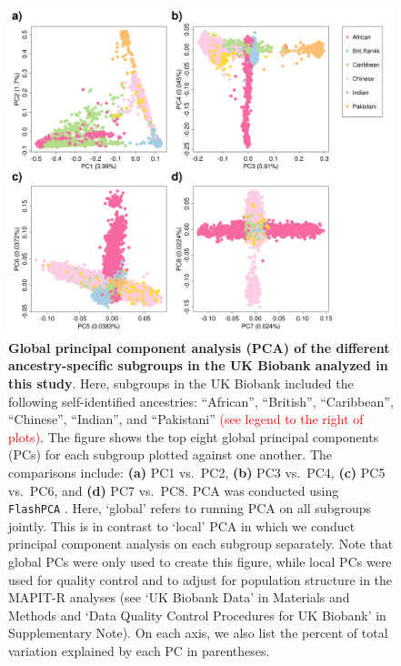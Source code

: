 \documentclass[10pt]{article}
\begin{document}
\begin{figure}[H]
\centering
\includegraphics[width = \textwidth]{Images/Supp/InterPath_Supp_Figure_UKB_PCAPlot_vs2.png}
\caption{\textbf{Global principal component analysis (PCA) of the different ancestry-specific subgroups in the UK Biobank analyzed in this study}. Here, subgroups in the UK Biobank included the following self-identified ancestries: ``African'', ``British'', ``Caribbean'', ``Chinese'', ``Indian'', and ``Pakistani'' \textcolor{red}{(see legend to the right of plots)}. The figure shows the top eight global principal components (PCs) for each subgroup plotted against one another. The comparisons include: \textbf{(a)} PC1 vs.~PC2, \textbf{(b)} PC3 vs.~PC4, \textbf{(c)} PC5 vs.~PC6, and \textbf{(d)} PC7 vs.~PC8. PCA was conducted using \texttt{FlashPCA} \cite{Abraham2017}. Here, `global' refers to running PCA on all subgroups jointly. This is in contrast to `local' PCA in which we conduct principal component analysis on each subgroup separately. Note that global PCs were only used to create this figure, while local PCs were used for quality control and to adjust for population structure in the MAPIT-R analyses (see `UK Biobank Data' in Materials and Methods and `Data Quality Control Procedures for UK Biobank' in Supplementary Note). On each axis, we also list the percent of total variation explained by each PC in parentheses.}
\label{InterPath-Supp-Figure-UKB-subgroups-PCAPlot}
\end{figure}
\clearpage
\end{document}
